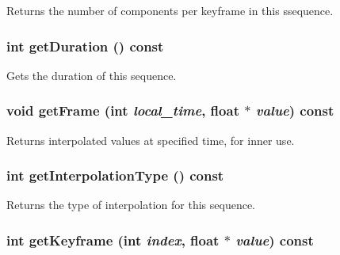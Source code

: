 Returns the number of components per keyframe in this ssequence. \hypertarget{classm3g_1_1KeyframeSequence_995a5ca5c8c3c993ef167f67cbb5fabe}{
\subsubsection[{getDuration}]{\setlength{\rightskip}{0pt plus 5cm}int getDuration () const}}
\label{classm3g_1_1KeyframeSequence_995a5ca5c8c3c993ef167f67cbb5fabe}


Gets the duration of this sequence. \hypertarget{classm3g_1_1KeyframeSequence_e172563df4ce29c6fa9bca679e9bba7c}{
\subsubsection[{getFrame}]{\setlength{\rightskip}{0pt plus 5cm}void getFrame (int {\em local\_\-time}, \/  float $\ast$ {\em value}) const}}
\label{classm3g_1_1KeyframeSequence_e172563df4ce29c6fa9bca679e9bba7c}


Returns interpolated values at specified time, for inner use. \hypertarget{classm3g_1_1KeyframeSequence_0d46321e7f46e037508cce88cdf6a487}{
\subsubsection[{getInterpolationType}]{\setlength{\rightskip}{0pt plus 5cm}int getInterpolationType () const}}
\label{classm3g_1_1KeyframeSequence_0d46321e7f46e037508cce88cdf6a487}


Returns the type of interpolation for this sequence. \hypertarget{classm3g_1_1KeyframeSequence_0fd27047149eedab8b10319768e1fe9a}{
\subsubsection[{getKeyframe}]{\setlength{\rightskip}{0pt plus 5cm}int getKeyframe (int {\em index}, \/  float $\ast$ {\em value}) const}}
\label{classm3g_1_1KeyframeSequence_0fd27047149eedab8b10319768e1fe9a}


